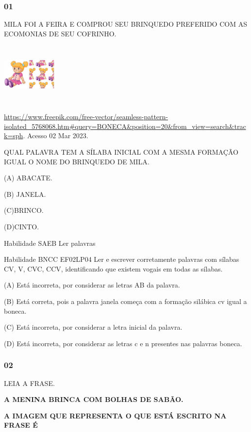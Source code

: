 \subsubsection{01 }\label{section-26}

MILA FOI A FEIRA E COMPROU SEU BRINQUEDO PREFERIDO COM AS ECOMONIAS DE
SEU COFRINHO.

\includegraphics[width=1.08889in,height=1.24236in]{media/image77.jpeg}

\url{https://www.freepik.com/free-vector/seamless-pattern-isolated_5768068.htm\#query=BONECA\&position=20\&from_view=search\&track=sph}.
Acesso 02 Mar 2023.

QUAL PALAVRA TEM A SÍLABA INICIAL COM A MESMA FORMAÇÃO IGUAL O NOME DO
BRINQUEDO DE MILA.

(A) ABACATE.

(B) JANELA.

(C)BRINCO.

(D)CINTO.

\protect\hypertarget{_Hlk128577378}{}{\protect\hypertarget{_Hlk128665495}{}{}}Habilidade
SAEB Ler palavras

Habilidade BNCC EF02LP04 Ler e escrever corretamente palavras com
sílabas CV, V, CVC, CCV, identificando que existem vogais em todas as
sílabas.

(A) Está incorreta, por considerar as letras AB da palavra.

(B) Está correta, pois a palavra janela começa com a formação silábica
cv igual a boneca.

(C) Está incorreta, por considerar a letra inicial da palavra.

(D) Está incorreta, por considerar as letras c e n presentes nas
palavras boneca.

\subsubsection{02}\label{section-27}

LEIA A FRASE.

\textbf{A MENINA BRINCA COM BOLHAS DE SABÃO.}

\textbf{A IMAGEM QUE REPRESENTA O QUE ESTÁ ESCRITO NA FRASE É}


